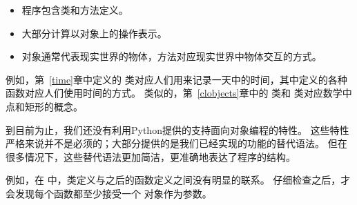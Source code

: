 \begin{itemize}

\item 程序包含类和方法定义。

\item 大部分计算以对象上的操作表示。

\item 对象通常代表现实世界的物体，方法对应现实世界中物体交互的方式。

\end{itemize}


例如，第~\ref{time}章中定义的  类对应人们用来记录一天中的时间，其中定义的各种函数对应人们使用时间的方式。
类似的，第~\ref{clobjects}章中的  类和  类对应数学中点和矩形的概念。


到目前为止，我们还没有利用Python提供的支持面向对象编程的特性。
这些特性严格来说并不是必须的；大部分提供的是我们已经实现的功能的替代语法。
但在很多情况下，这些替代语法更加简洁，更准确地表达了程序的结构。


例如，在  中，类定义与之后的函数定义之间没有明显的联系。
仔细检查之后，才会发现每个函数都至少接受一个  对象作为参数。


